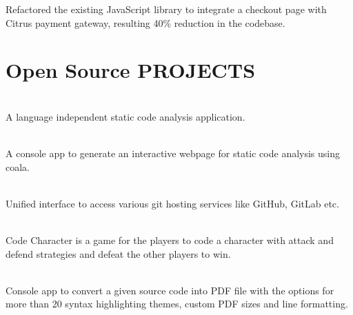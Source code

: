 \documentclass[]{deedy-resume-openfont}
\begin{document}
\begin{minipage}[t]{0.66\textwidth}
\vspace{\topsep} 
\begin{tightemize}
\item Refactored the existing JavaScript library to integrate a checkout page with Citrus payment gateway, resulting 40\% reduction in the codebase. \end{tightemize}
\sectionsep




\section{Open Source PROJECTS}

\\
A language independent static code analysis application. \textbf{\href{https://github.com/coala/coala}{ }}
\sectionsep

\\
A console app to generate an interactive webpage for static code analysis using coala.
\textbf{\href{https://github.com/coala/coala-html}{ }}
\sectionsep

\\
Unified interface to access various git hosting services like GitHub, GitLab etc.
\textbf{\href{https://gitlab.com/gitmate/IGitt/}{ }}
\sectionsep

\\
Code Character is a game for the players to code a character with attack and defend strategies and defeat the other players to win.
\textbf{\href{https://github.com/ash7594/code-control}{}}
\sectionsep

\\
Console app to convert a given source code into PDF file with the options for more than 20 syntax highlighting themes, custom PDF sizes and line formatting. \textbf{\href{https://github.com/tushar-rishav/code2pdf}{}}
\sectionsep


\end{minipage}
\end{document}
